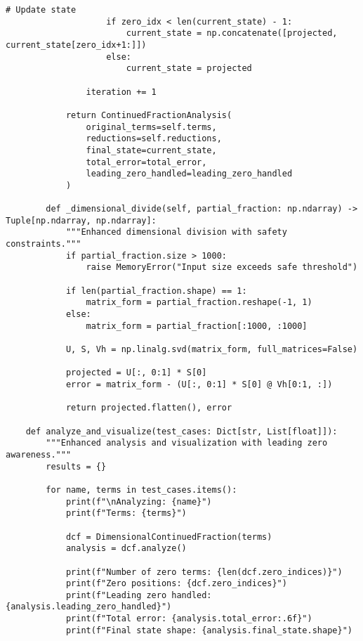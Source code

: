 \begin{lstlisting}[caption={Enhanced Continued Fraction Analysis Framework},label={lst:analysis-code}]
                    # Update state
                    if zero_idx < len(current_state) - 1:
                        current_state = np.concatenate([projected, current_state[zero_idx+1:]])
                    else:
                        current_state = projected
                        
                iteration += 1
            
            return ContinuedFractionAnalysis(
                original_terms=self.terms,
                reductions=self.reductions,
                final_state=current_state,
                total_error=total_error,
                leading_zero_handled=leading_zero_handled
            )
        
        def _dimensional_divide(self, partial_fraction: np.ndarray) -> Tuple[np.ndarray, np.ndarray]:
            """Enhanced dimensional division with safety constraints."""
            if partial_fraction.size > 1000:
                raise MemoryError("Input size exceeds safe threshold")
                
            if len(partial_fraction.shape) == 1:
                matrix_form = partial_fraction.reshape(-1, 1)
            else:
                matrix_form = partial_fraction[:1000, :1000]
                
            U, S, Vh = np.linalg.svd(matrix_form, full_matrices=False)
            
            projected = U[:, 0:1] * S[0]
            error = matrix_form - (U[:, 0:1] * S[0] @ Vh[0:1, :])
            
            return projected.flatten(), error
    
    def analyze_and_visualize(test_cases: Dict[str, List[float]]):
        """Enhanced analysis and visualization with leading zero awareness."""
        results = {}
        
        for name, terms in test_cases.items():
            print(f"\nAnalyzing: {name}")
            print(f"Terms: {terms}")
            
            dcf = DimensionalContinuedFraction(terms)
            analysis = dcf.analyze()
            
            print(f"Number of zero terms: {len(dcf.zero_indices)}")
            print(f"Zero positions: {dcf.zero_indices}")
            print(f"Leading zero handled: {analysis.leading_zero_handled}")
            print(f"Total error: {analysis.total_error:.6f}")
            print(f"Final state shape: {analysis.final_state.shape}")
            

\end{lstlisting}
